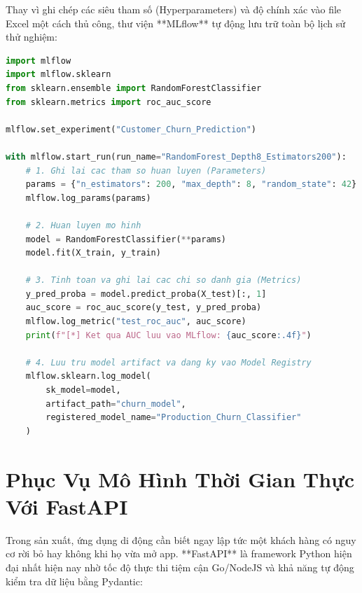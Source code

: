 \begin{thuchanhbox}
Thay vì ghi chép các siêu tham số (Hyperparameters) và độ chính xác vào file Excel một cách thủ công, thư viện **MLflow** tự động lưu trữ toàn bộ lịch sử thử nghiệm:

\begin{lstlisting}[language=Python]
import mlflow
import mlflow.sklearn
from sklearn.ensemble import RandomForestClassifier
from sklearn.metrics import roc_auc_score

mlflow.set_experiment("Customer_Churn_Prediction")

with mlflow.start_run(run_name="RandomForest_Depth8_Estimators200"):
    # 1. Ghi lai cac tham so huan luyen (Parameters)
    params = {"n_estimators": 200, "max_depth": 8, "random_state": 42}
    mlflow.log_params(params)
    
    # 2. Huan luyen mo hinh
    model = RandomForestClassifier(**params)
    model.fit(X_train, y_train)
    
    # 3. Tinh toan va ghi lai cac chi so danh gia (Metrics)
    y_pred_proba = model.predict_proba(X_test)[:, 1]
    auc_score = roc_auc_score(y_test, y_pred_proba)
    mlflow.log_metric("test_roc_auc", auc_score)
    print(f"[*] Ket qua AUC luu vao MLflow: {auc_score:.4f}")
    
    # 4. Luu tru model artifact va dang ky vao Model Registry
    mlflow.sklearn.log_model(
        sk_model=model,
        artifact_path="churn_model",
        registered_model_name="Production_Churn_Classifier"
    )
\end{lstlisting}
\end{thuchanhbox}

\section{Phục Vụ Mô Hình Thời Gian Thực Với FastAPI}

Trong sản xuất, ứng dụng di động cần biết ngay lập tức một khách hàng có nguy cơ rời bỏ hay không khi họ vừa mở app. **FastAPI** là framework Python hiện đại nhất hiện nay nhờ tốc độ thực thi tiệm cận Go/NodeJS và khả năng tự động kiểm tra dữ liệu bằng Pydantic:

